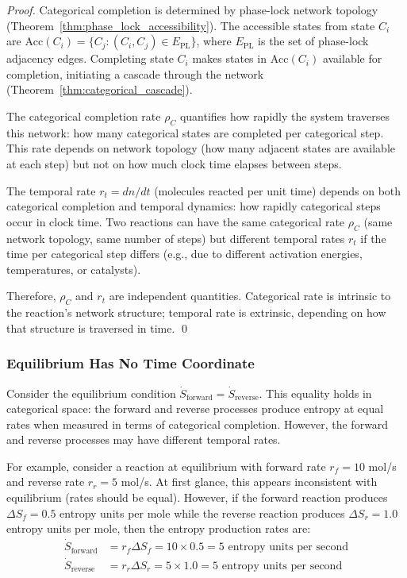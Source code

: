 \documentclass[12pt,a4paper]{article}
\theoremstyle{definition}
\theoremstyle{remark}
\newcommand{\accessible}{\text{Acc}}
\begin{document}
\begin{proof}
Categorical completion is determined by phase-lock network topology (Theorem~\ref{thm:phase_lock_accessibility}). The accessible states from state $C_i$ are $\accessible(C_i) = \{C_j : (C_i, C_j) \in E_{\text{PL}}\}$, where $E_{\text{PL}}$ is the set of phase-lock adjacency edges. Completing state $C_i$ makes states in $\accessible(C_i)$ available for completion, initiating a cascade through the network (Theorem~\ref{thm:categorical_cascade}).

The categorical completion rate $\rho_C$ quantifies how rapidly the system traverses this network: how many categorical states are completed per categorical step. This rate depends on network topology (how many adjacent states are available at each step) but not on how much clock time elapses between steps.

The temporal rate $r_t = dn/dt$ (molecules reacted per unit time) depends on both categorical completion and temporal dynamics: how rapidly categorical steps occur in clock time. Two reactions can have the same categorical rate $\rho_C$ (same network topology, same number of steps) but different temporal rates $r_t$ if the time per categorical step differs (e.g., due to different activation energies, temperatures, or catalysts).

Therefore, $\rho_C$ and $r_t$ are independent quantities. Categorical rate is intrinsic to the reaction's network structure; temporal rate is extrinsic, depending on how that structure is traversed in time. \qed
\end{proof}

\subsubsection{Equilibrium Has No Time Coordinate}

Consider the equilibrium condition $\dot{S}_{\text{forward}} = \dot{S}_{\text{reverse}}$. This equality holds in categorical space: the forward and reverse processes produce entropy at equal rates when measured in terms of categorical completion. However, the forward and reverse processes may have different temporal rates.

For example, consider a reaction at equilibrium with forward rate $r_f = 10$ mol/s and reverse rate $r_r = 5$ mol/s. At first glance, this appears inconsistent with equilibrium (rates should be equal). However, if the forward reaction produces $\Delta S_f = 0.5$ entropy units per mole while the reverse reaction produces $\Delta S_r = 1.0$ entropy units per mole, then the entropy production rates are:
\begin{align}
\dot{S}_{\text{forward}} &= r_f \Delta S_f = 10 \times 0.5 = 5 \text{ entropy units per second} \\
\dot{S}_{\text{reverse}} &= r_r \Delta S_r = 5 \times 1.0 = 5 \text{ entropy units per second}
\end{align}
\end{document}
